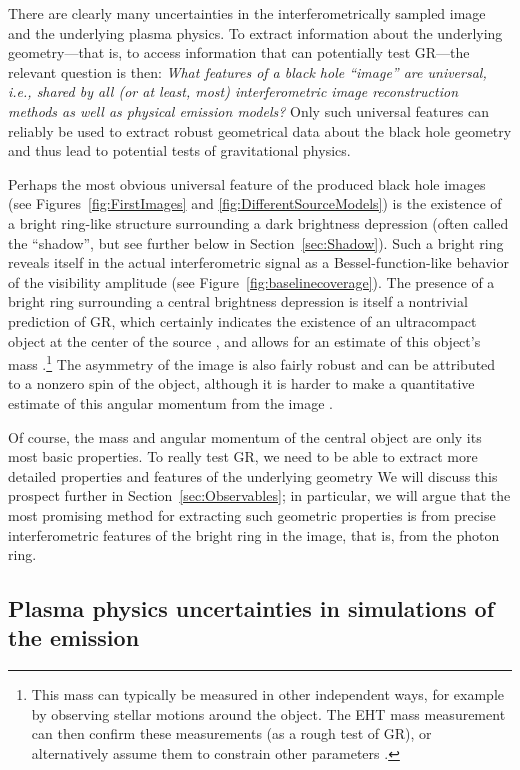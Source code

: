 \documentclass[graybox,envcountchap]{svmult}
\begin{document}
\bigskip

There are clearly many uncertainties in the interferometrically sampled image and the underlying plasma physics.
To extract information about the underlying geometry---that is, to access information that can potentially test GR---the relevant question is then: \emph{What features of a black hole ``image'' are universal, i.e., shared by all (or at least, most) interferometric image reconstruction methods as well as physical emission models?}
Only such universal features can reliably be used to extract robust geometrical data about the black hole geometry and thus lead to potential tests of gravitational physics.

Perhaps the most obvious universal feature of the produced black hole images (see Figures~\ref{fig:FirstImages} and \ref{fig:DifferentSourceModels}) is the existence of a bright ring-like structure surrounding a dark brightness depression (often called the ``shadow'', but see further below in Section~\ref{sec:Shadow}).
Such a bright ring reveals itself in the actual interferometric signal as a Bessel-function-like behavior of the visibility amplitude (see Figure~\ref{fig:baselinecoverage}).
The presence of a bright ring surrounding a central brightness depression is itself a nontrivial prediction of GR, which certainly indicates the existence of an ultracompact object at the center of the source \cite{EHT2019I}, and allows for an estimate of this object's mass \cite{EHT2019VI}.\footnote{This mass can typically be measured in other independent ways, for example by observing stellar motions around the object.
The EHT mass measurement can then confirm these measurements (as a rough test of GR), or alternatively assume them to constrain other parameters \cite{EHT2019VI}.}
The asymmetry of the image is also fairly robust and can be attributed to a nonzero spin of the object, although it is harder to make a quantitative estimate of this angular momentum from the image \cite{EHT2019V}.

Of course, the mass and angular momentum of the central object are only its most basic properties.
To really test GR, we need to be able to extract more detailed properties and features of the underlying geometry
We will discuss this prospect further in Section~\ref{sec:Observables}; in particular, we will argue that the most promising method for extracting such geometric properties is from precise interferometric features of the bright ring in the image, that is, from the photon ring.

\subsection{Plasma physics uncertainties in simulations of the emission}
\label{sec:Plasma}
\end{document}
